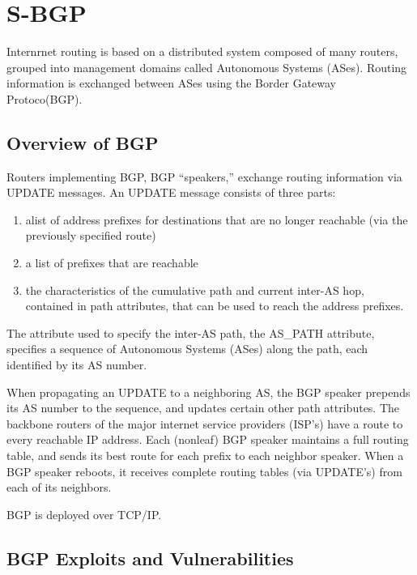 \documentclass[12pt]{article}
\begin{document}
\section{S-BGP}
Internrnet routing is based on a distributed system composed of many routers, grouped into management domains called Autonomous Systems (ASes). Routing information
is exchanged between ASes using the Border Gateway Protoco(BGP).

\subsection{Overview of BGP}

Routers implementing BGP, BGP “speakers,” exchange routing information via UPDATE messages. An UPDATE message consists of three parts:
\begin{enumerate}
\item  alist of address prefixes
for destinations that are no longer reachable (via the previously specified route) 
\item a list of prefixes that
are reachable
\item the characteristics of the cumulative path and
current inter-AS hop, contained in path attributes, that can be
used to reach the address prefixes. 
\end{enumerate}

The attribute used to specify the inter-AS path, the AS\_PATH attribute, specifies a sequence
of Autonomous Systems (ASes) along the path, each identified
by its AS number.

When propagating an UPDATE to a neighboring AS, the BGP
speaker prepends its AS number to the sequence, and updates
certain other path attributes. 
The backbone routers of the major internet service providers
(ISP’s) have a route to every reachable IP address. 
Each (nonleaf) BGP speaker maintains a full routing table, and
sends its best route for each prefix to each neighbor speaker.
When a BGP speaker reboots, it receives complete routing tables (via UPDATE’s) from each of its neighbors. 

BGP is deployed over TCP/IP.

\subsection{BGP Exploits and Vulnerabilities}
\end{document}
